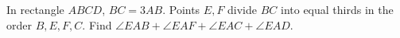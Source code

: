 In rectangle $ABCD$, $BC=3AB$. Points $E,F$ divide $BC$ into equal thirds in the order $B,E,F,C$. Find $\angle EAB+\angle EAF+\angle EAC+\angle EAD$.
